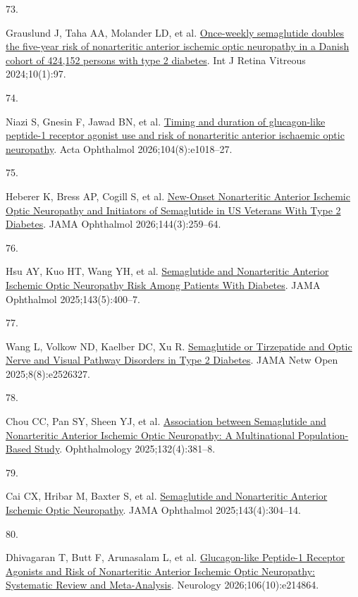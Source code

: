 \documentclass[
  11pt,
]{article}
\newlength{\cslhangindent}
\newlength{\csllabelwidth}
\newenvironment{CSLReferences}[2] %
 {\begin{list}{}{%
  \setlength{\itemindent}{0pt}
  \setlength{\leftmargin}{0pt}
  \setlength{\parsep}{0pt}
  \ifodd #1
   \setlength{\leftmargin}{\cslhangindent}
   \setlength{\itemindent}{-1\cslhangindent}
  \fi
  \setlength{\itemsep}{#2\baselineskip}}}
 {\end{list}}
\newcommand{\CSLLeftMargin}[1]{\parbox[t]{\csllabelwidth}{\strut#1\strut}}
\newcommand{\CSLRightInline}[1]{\parbox[t]{\linewidth - \csllabelwidth}{\strut#1\strut}}
\begin{document}
\begin{CSLReferences}{0}{1}
\CSLLeftMargin{73. }%
\CSLRightInline{Grauslund J, Taha AA, Molander LD, et al.
\href{https://doi.org/10.1186/s40942-024-00620-x}{{Once-weekly
semaglutide doubles the five-year risk of nonarteritic anterior ischemic
optic neuropathy in a Danish cohort of 424,152 persons with type 2
diabetes}}. Int J Retina Vitreous 2024;10(1):97. }

\CSLLeftMargin{74. }%
\CSLRightInline{Niazi S, Gnesin F, Jawad BN, et al.
\href{https://doi.org/10.1111/aos.70168}{{Timing and duration of
glucagon-like peptide-1 receptor agonist use and risk of nonarteritic
anterior ischaemic optic neuropathy}}. Acta Ophthalmol
2026;104(8):e1018--27. }

\CSLLeftMargin{75. }%
\CSLRightInline{Heberer K, Bress AP, Cogill S, et al.
\href{https://doi.org/10.1001/jamaophthalmol.2025.6262}{{New-Onset
Nonarteritic Anterior Ischemic Optic Neuropathy and Initiators of
Semaglutide in US Veterans With Type 2 Diabetes}}. JAMA Ophthalmol
2026;144(3):259--64. }

\CSLLeftMargin{76. }%
\CSLRightInline{Hsu AY, Kuo HT, Wang YH, et al.
\href{https://doi.org/10.1001/jamaophthalmol.2025.0349}{{Semaglutide and
Nonarteritic Anterior Ischemic Optic Neuropathy Risk Among Patients With
Diabetes}}. JAMA Ophthalmol 2025;143(5):400--7. }

\CSLLeftMargin{77. }%
\CSLRightInline{Wang L, Volkow ND, Kaelber DC, Xu R.
\href{https://doi.org/10.1001/jamanetworkopen.2025.26327}{{Semaglutide
or Tirzepatide and Optic Nerve and Visual Pathway Disorders in Type 2
Diabetes}}. JAMA Netw Open 2025;8(8):e2526327. }

\CSLLeftMargin{78. }%
\CSLRightInline{Chou CC, Pan SY, Sheen YJ, et al.
\href{https://doi.org/10.1016/j.ophtha.2024.10.030}{{Association between
Semaglutide and Nonarteritic Anterior Ischemic Optic Neuropathy: A
Multinational Population-Based Study}}. Ophthalmology
2025;132(4):381--8. }

\CSLLeftMargin{79. }%
\CSLRightInline{Cai CX, Hribar M, Baxter S, et al.
\href{https://doi.org/10.1001/jamaophthalmol.2024.6555}{{Semaglutide and
Nonarteritic Anterior Ischemic Optic Neuropathy}}. JAMA Ophthalmol
2025;143(4):304--14. }

\CSLLeftMargin{80. }%
\CSLRightInline{Dhivagaran T, Butt F, Arunasalam L, et al.
\href{https://doi.org/10.1212/WNL.0000000000214864}{{Glucagon-like
Peptide-1 Receptor Agonists and Risk of Nonarteritic Anterior Ischemic
Optic Neuropathy: Systematic Review and Meta-Analysis}}. Neurology
2026;106(10):e214864. }


\end{CSLReferences}
\end{document}
